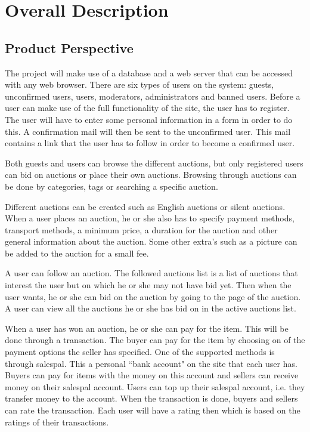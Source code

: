 \chapter{Overall Description}

\section{Product Perspective}

	The project will make use of a database and a web server that can be 
	accessed with any web browser. There are six types of users on the system:
	guests, unconfirmed users, users, moderators, administrators and banned users. 
	Before a user can make use of the full functionality of the site, the user has to register. The user
	will have to enter some personal information in a form in order to do this. A confirmation mail will then be sent to the unconfirmed user. This mail contains a link that the user has to follow in order to become a confirmed user.
	
	Both guests and users can browse the different auctions, but only registered 
	users can bid on auctions or place their own auctions. Browsing through auctions can be done by categories, tags or searching a specific auction. 
	
	Different auctions can be created such as English auctions\cite{English} or
	silent auctions\cite{silent}. When a user places an auction, he or she also has to specify
	payment methods, transport methods, a minimum price, a duration for the auction
	and other general information about the auction. Some other extra's such as a picture can be added to the auction for a small fee.
	
	A user can follow an auction. The followed auctions list is a list of auctions that interest the user
	but on which he or she may not have bid yet. Then when the user wants, he or she can bid on the auction
	by going to the page of the auction.
	A user can view all the auctions he or she has bid on in the active auctions list.
	
	When a user has won an auction, he or she can pay for the item. This will be done through a 
	transaction. The buyer can pay for the item by choosing on of the payment options the seller 
	has specified. One of the supported methods is through salespal. This a personal ``bank account" on
	the site that each user has. Buyers can pay for items with the money on this account and 
	sellers can receive money on their salespal account. Users can top up their salespal account,
	i.e. they transfer money to the account. When the transaction is done, buyers and sellers 
	can rate the transaction. Each user will have a rating then which is based on the ratings
	of their transactions. 
	
